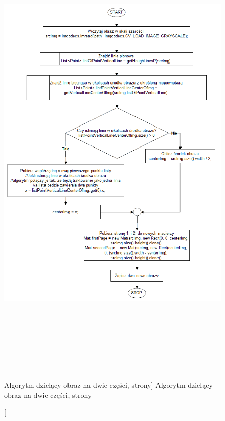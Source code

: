 \documentclass[a4paper,12pt]{article}
\begin{document}
    	        \begin{figure}[!ht]  
    			    \begin{center}
    				  \includegraphics[height=22.5cm]{image//algorithm//divideToPage.png} 
    			    \end{center}
    			    \caption
        			    [Algorytm dzielący obraz na dwie części, strony]
        			    {Algorytm dzielący obraz na dwie części, strony}  
    		    \end{figure}
    		
    		\newpage
    		
\end{document}
